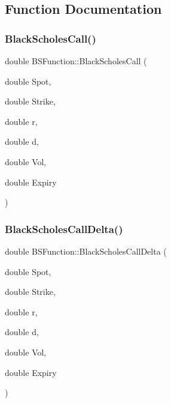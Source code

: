 \subsection{Function Documentation}
\hypertarget{namespaceBSFunction_aa60a1ed497dc546c36602310f828cf6d}{}\label{namespaceBSFunction_aa60a1ed497dc546c36602310f828cf6d} 
\subsubsection{\texorpdfstring{Black\+Scholes\+Call()}{BlackScholesCall()}}
{\footnotesize\ttfamily double B\+S\+Function\+::\+Black\+Scholes\+Call (\begin{DoxyParamCaption}\item[{double}]{Spot,  }\item[{double}]{Strike,  }\item[{double}]{r,  }\item[{double}]{d,  }\item[{double}]{Vol,  }\item[{double}]{Expiry }\end{DoxyParamCaption})}

\hypertarget{namespaceBSFunction_a05c41b06001667e14920f12ce67278f0}{}\label{namespaceBSFunction_a05c41b06001667e14920f12ce67278f0} 
\subsubsection{\texorpdfstring{Black\+Scholes\+Call\+Delta()}{BlackScholesCallDelta()}}
{\footnotesize\ttfamily double B\+S\+Function\+::\+Black\+Scholes\+Call\+Delta (\begin{DoxyParamCaption}\item[{double}]{Spot,  }\item[{double}]{Strike,  }\item[{double}]{r,  }\item[{double}]{d,  }\item[{double}]{Vol,  }\item[{double}]{Expiry }\end{DoxyParamCaption})}

\hypertarget{namespaceBSFunction_a3cfae33fb39077bd583237ad5687184a}{}\label{namespaceBSFunction_a3cfae33fb39077bd583237ad5687184a} 
